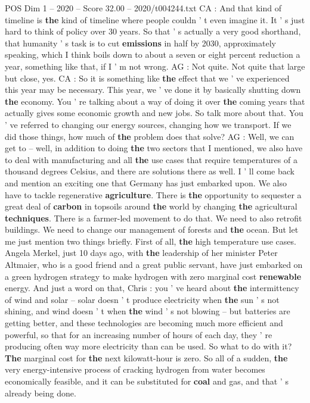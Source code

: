 \begin{textsample}{POS Dim 1 – 2020 – Score 32.00 – 2020/t004244.txt}
CA : And that kind of timeline is \textbf{the} kind of timeline where people couldn ' t even imagine it.
It ' s just hard to think of policy over 30 years.
So that ' s actually a very good shorthand, that humanity ' s task is to cut \textbf{emissions} in half by 2030, approximately speaking, which I think boils down to about a seven or eight percent reduction a year, something like that, if I ' m not wrong.
AG : Not quite.
Not quite that large but close, yes.
CA : So it is something like \textbf{the} effect that we ' ve experienced this year may be necessary.
This year, we ' ve done it by basically shutting down \textbf{the} economy.
You ' re talking about a way of doing it over \textbf{the} coming years that actually gives some economic growth and new jobs.
So talk more about that.
You ' ve referred to changing our energy sources, changing how we transport.
If we did those things, how much of \textbf{the} problem does that solve?
AG : Well, we can get to -- well, in addition to doing \textbf{the} two sectors that I mentioned, we also have to deal with manufacturing and all \textbf{the} use cases that require temperatures of a thousand degrees Celsius, and there are solutions there as well.
I ' ll come back and mention an exciting one that Germany has just embarked upon.
We also have to tackle regenerative \textbf{agriculture}.
There is \textbf{the} opportunity to sequester a great deal of \textbf{carbon} in topsoils around \textbf{the} world by changing \textbf{the} agricultural \textbf{techniques}.
There is a farmer-led movement to do that.
We need to also retrofit buildings.
We need to change our management of forests and \textbf{the} ocean.
But let me just mention two things briefly.
First of all, \textbf{the} high temperature use cases.
Angela Merkel, just 10 days ago, with \textbf{the} leadership of her minister Peter Altmaier, who is a good friend and a great public servant, have just embarked on a green hydrogen strategy to make hydrogen with zero marginal cost \textbf{renewable} energy.
And just a word on that, Chris : you ' ve heard about \textbf{the} intermittency of wind and solar -- solar doesn ' t produce electricity when \textbf{the} sun ' s not shining, and wind doesn ' t when \textbf{the} wind ' s not blowing -- but batteries are getting better, and these technologies are becoming much more efficient and powerful, so that for an increasing number of hours of each day, they ' re producing often way more electricity than can be used.
So what to do with it? \textbf{The} marginal cost for \textbf{the} next kilowatt-hour is zero.
So all of a sudden, \textbf{the} very energy-intensive process of cracking hydrogen from water becomes economically feasible, and it can be substituted for \textbf{coal} and gas, and that ' s already being done.

\end{textsample}
